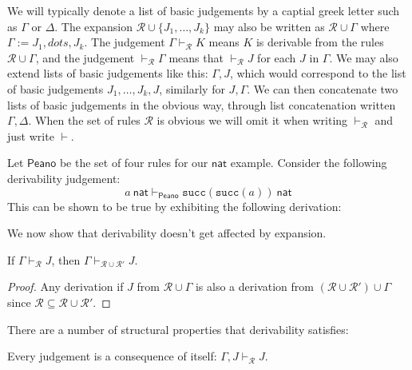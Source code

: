 \begin{remark}
    We will typically denote a list of basic judgements by a captial greek letter such as $\Gamma$ or $\Delta$. The expansion $\mathcal{R} \cup \{ J_1, \dots, J_k \}$ may also be written as $\mathcal{R} \cup \Gamma$ where $\Gamma := J_1, dots, J_k$. The judgement $\Gamma \vdash_{\mathcal{R}} K$ means $K$ is derivable from the rules $\mathcal{R} \cup \Gamma$, and the judgement $\vdash _{\mathcal{R}} \Gamma$ means that $\vdash _{\mathcal{R}} J$ for each $J$ in $\Gamma$. We may also extend lists of basic judgements like this: $\Gamma, J$, which would correspond to the list of basic judgements $J_1, \dots, J_k, J$, similarly for $J, \Gamma$. We can then concatenate two lists of basic judgements in the obvious way, through list concatenation written $\Gamma, \Delta$. When the set of rules $\mathcal{R}$ is obvious we will omit it when writing $\vdash_{\mathcal{R}}$ and just write $\vdash$.
\end{remark}

\begin{example}
    Let $\mathsf{Peano}$ be the set of four rules for our $\mathsf{nat}$ example. Consider the following derivability judgement:
    $$a\ \mathsf{nat} \vdash_{\mathsf{Peano}} \texttt{succ}(\texttt{succ}(a))\ \mathsf{nat}$$
    This can be shown to be true by exhibiting the following derivation:
    \begin{prooftree}
    \end{prooftree}
\end{example}

We now show that derivability doesn't get affected by expansion.

\begin{lemma}[Stability]
    If $\Gamma \vdash_{\mathcal{R}} J$, then $\Gamma \vdash_{\mathcal{R} \cup \mathcal{R'}} J$.
\end{lemma}

\begin{proof}
    Any derivation if $J$ from $\mathcal{R} \cup \Gamma$ is also a derivation from $(\mathcal{R} \cup \mathcal{R}') \cup \Gamma$ since $\mathcal{R} \subseteq \mathcal{R}\cup \mathcal{R}'$.
\end{proof}

There are a number of structural properties that derivability satisfies:

\begin{lemma}[Reflexivity]
    Every judgement is a consequence of itself: $\Gamma, J\vdash_{\mathcal{R}} J$.
\end{lemma}

